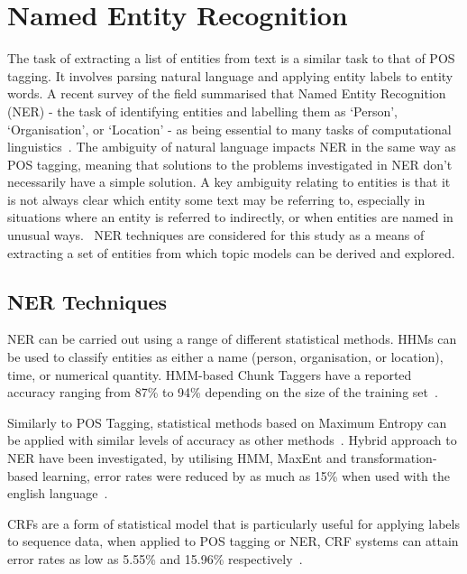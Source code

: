 \documentclass[10pt]{report}
\begin{document}
\section{Named Entity Recognition}
The task of extracting a list of entities from text is a similar task to that of POS tagging. It involves parsing natural language and applying entity labels to entity words. A recent survey of the field summarised that Named Entity Recognition (NER) - the task of identifying entities and labelling them as ‘Person’, ‘Organisation’, or ‘Location’ - as being essential to many tasks of computational linguistics~\cite{Nadeau2007-tp}. The ambiguity of natural language impacts NER in the same way as POS tagging, meaning that solutions to the problems investigated in NER don't necessarily have a simple solution. A key ambiguity relating to entities is that it is not always clear which entity some text may be referring to, especially in situations where an entity is referred to indirectly, or when entities are named in unusual ways.~\cite{Ratinov2009-gw} NER techniques are considered for this study as a means of extracting a set of entities from which topic models can be derived and explored. 

\subsection{NER Techniques}
NER can be carried out using a range of different statistical methods. HHMs can be used to classify entities as either a name (person, organisation, or location), time, or numerical quantity. HMM-based Chunk Taggers have a reported accuracy ranging from 87\% to 94\% depending on the size of the training set~\cite{Zhou2002-st}.

Similarly to POS Tagging, statistical methods based on Maximum Entropy can be applied with similar levels of accuracy as other methods~\cite{Borthwick1999-tg,Bender2003-lc}. Hybrid approach to NER have been investigated, by utilising HMM, MaxEnt and transformation-based learning, error rates were reduced by as much as 15\% when used with the english language~\cite{Tjong_Kim2003-ym}.

CRFs are a form of statistical model that is particularly useful for applying labels to sequence data, when applied to POS tagging or NER, CRF systems can attain error rates as low as 5.55\% and 15.96\% respectively~\cite{Lafferty2001-ab,McCallum2003-yu}.
\end{document}
